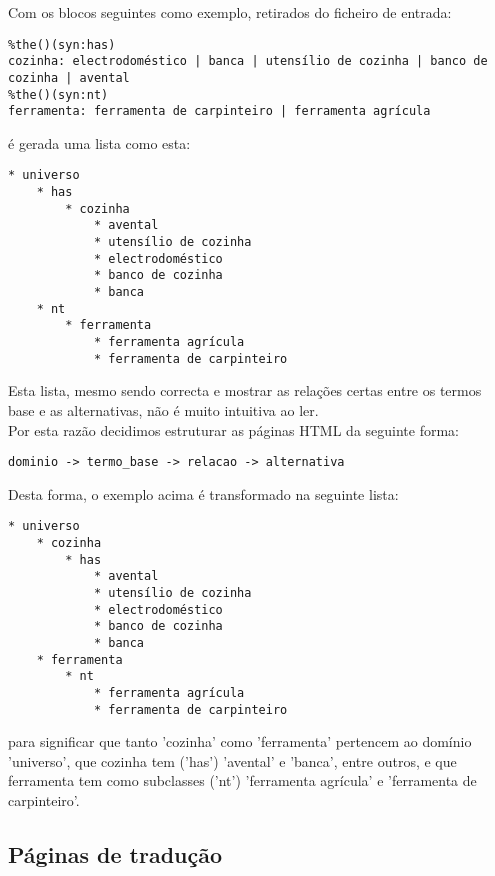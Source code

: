 \documentclass{report}
\begin{document}
Com os blocos seguintes como exemplo, retirados do ficheiro de entrada:

\begin{verbatim}
%the()(syn:has)
cozinha: electrodoméstico | banca | utensílio de cozinha | banco de cozinha | avental
%the()(syn:nt)
ferramenta: ferramenta de carpinteiro | ferramenta agrícula
\end{verbatim}

é gerada uma lista como esta:

\begin{verbatim}
* universo
    * has
        * cozinha
            * avental
            * utensílio de cozinha
            * electrodoméstico
            * banco de cozinha
            * banca
    * nt
        * ferramenta
            * ferramenta agrícula
            * ferramenta de carpinteiro
\end{verbatim}

Esta lista, mesmo sendo correcta e mostrar as relações certas entre os termos base e as alternativas, não é muito intuitiva ao ler.\\

Por esta razão decidimos estruturar as páginas HTML da seguinte forma:

\begin{verbatim}
dominio -> termo_base -> relacao -> alternativa
\end{verbatim}

Desta forma, o exemplo acima é transformado na seguinte lista:\\

\begin{verbatim}
* universo
    * cozinha
        * has
            * avental
            * utensílio de cozinha
            * electrodoméstico
            * banco de cozinha
            * banca
    * ferramenta
        * nt
            * ferramenta agrícula
            * ferramenta de carpinteiro
\end{verbatim}

para significar que tanto 'cozinha' como 'ferramenta' pertencem ao domínio 'universo', que cozinha tem ('has') 'avental' e 'banca', entre outros, e que ferramenta tem como subclasses ('nt') 'ferramenta agrícula' e 'ferramenta de carpinteiro'.\\

\subsection{Páginas de tradução}
\end{document}
